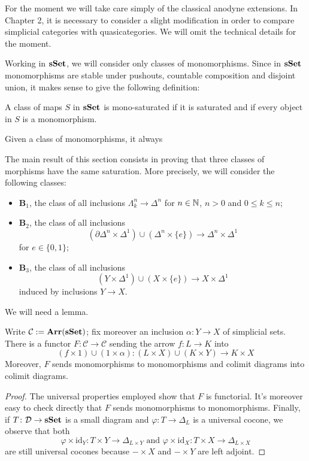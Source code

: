 For the moment we will take care simply of the classical anodyne extensions. In Chapter 2, it is necessary to consider a slight modification in order to compare simplicial categories with quasicategories. We will omit the technical details for the moment.

Working in $\mathbf{sSet}$, we will consider only classes of monomorphisms. Since in $\mathbf{sSet}$ monomorphisms are stable under pushouts, countable composition and disjoint union, it makes sense to give the following definition:

\begin{defin}
A class of maps $S$ in $\mathbf{sSet}$ is mono-saturated if it is saturated and if every object in $S$ is a monomorphism.
\end{defin}

Given a class of monomorphisms, it always 

The main result of this section consists in proving that three classes of morphisms have the same saturation. More precisely, we will consider the following classes:
\begin{itemize}
\item $\mathbf B_1$, the class of all inclusions $\Lambda^n_k \to \Delta^n$ for $n \in \mathbb{N}$, $n > 0$ and $0 \le k \le n$;
\item $\mathbf B_2$, the class of all inclusions
\[
(\partial \Delta^n \times \Delta^1) \cup (\Delta^n \times \{e\}) \to \Delta^n \times \Delta^1
\]
for $e \in \{0,1\}$;
\item $\mathbf B_3$, the class of all inclusions
\[
(Y \times \Delta^1) \cup (X \times \{e\}) \to X \times \Delta^1
\]
induced by inclusions $Y \to X$.
\end{itemize}

We will need a lemma.

\begin{lemma}
Write $\mathcal C := \mathbf{Arr}(\mathbf{sSet})$; fix moreover an inclusion $\alpha \colon Y \to X$ of simplicial sets. There is a functor $F \colon \mathcal C \to \mathcal C$ sending the arrow $f \colon L \to K$ into
\[
(f \times 1) \cup (1 \times \alpha) \colon (L \times X) \cup (K \times Y) \to K \times X
\]
Moreover, $F$ sends monomorphisms to monomorphisms and colimit diagrams into colimit diagrams.
\end{lemma}

\begin{proof}
The universal properties employed show that $F$ is functorial. It's moreover easy to check directly that $F$ sends monomorphisms to monomorphisms. Finally, if $T \colon \mathcal D \to \mathbf{sSet}$ is a small diagram and $\varphi \colon T \to \Delta_L$ is a universal cocone, we observe that both
\[
\varphi \times \mathrm{id}_Y \colon T \times Y \to \Delta_{L \times Y} \text{ and } \varphi \times \mathrm{id}_X \colon T \times X \to \Delta_{L \times X}
\]
are still universal cocones because $- \times X$ and $- \times Y$ are left adjoint.
\end{proof}

